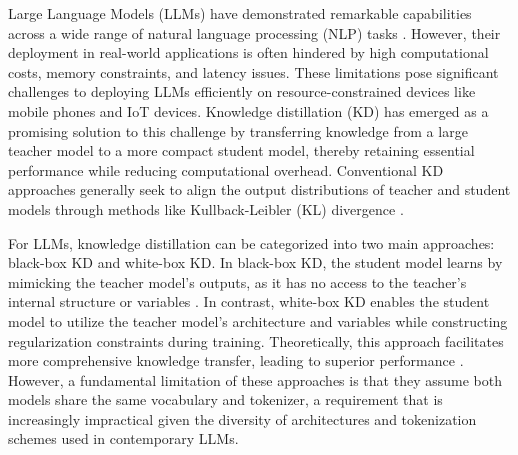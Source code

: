 
Large Language Models (LLMs) have demonstrated remarkable capabilities across a wide range of natural language processing (NLP) tasks \citep{achiam2023gpt, touvron2023llama, jiang2023mistral, jiang2024mixtral, guo2025deepseek}. However, their deployment in real-world applications is often hindered by high computational costs, memory constraints, and latency issues. These limitations pose significant challenges to deploying LLMs efficiently on resource-constrained devices like mobile phones and IoT devices. Knowledge distillation (KD) \cite{hinton2015distilling} has emerged as a promising solution to this challenge by transferring knowledge from a large teacher model to a more compact student model, thereby retaining essential performance while reducing computational overhead. Conventional KD approaches generally seek to align the output distributions of teacher and student models through methods like Kullback-Leibler (KL) divergence \citep{zhang2023not, hsieh2023distilling, ko2024distillm}. 

For LLMs, knowledge distillation can be categorized into two main approaches: black-box KD and white-box KD. In black-box KD, the student model learns by mimicking the teacher model’s outputs, as it has no access to the teacher’s internal structure or variables \cite{fu2023specializing, kim2016sequence}. In contrast, white-box KD enables the student model to utilize the teacher model’s architecture and variables while constructing regularization constraints during training. Theoretically, this approach facilitates more comprehensive knowledge transfer, leading to superior performance \cite{wen2023f, gu2024minillm, ko2024distillm}. However, a fundamental limitation of these approaches is that they assume both models share the same vocabulary and tokenizer, a requirement that is increasingly impractical given the diversity of architectures and tokenization schemes used in contemporary LLMs. 

